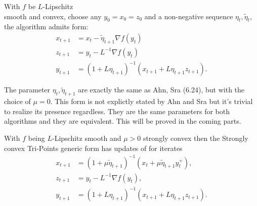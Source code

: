 \documentclass[12pt]{article}
\begin{document}
            \begin{definition}\label{def:agg_tri}
                With $f$ be $L$-Lipschitz \\ 
                smooth and convex, choose any $y_0 = x_0=z_0$ and a non-negative sequence $\eta_t, \tilde\eta_t$, the algorithm admits form: 
                \begin{align*}
                    x_{t + 1} &= x_t - \tilde \eta_{t + 1} \nabla f(y_t) 
                    \\
                    z_{t + 1} &= y_t - L^{-1} \nabla f(y_t) 
                    \\
                    y_{t + 1} &= 
                    (1 + L\eta_{t + 1})^{-1}
                    (
                    x_{t + 1} + L\eta_{t + 1}z_{t + 1}
                    ). 
                \end{align*}
            \end{definition}
            \begin{remark}
                The parameter $\eta_t, \tilde\eta_{t + 1}$ are exactly the same as Ahn, Sra (6.24), but with the choice of $\mu = 0$. 
                This form is not explictly stated by Ahn and Sra but it's trivial to realize its presence regardless. 
                They are the same parameters for both algorithms and they are equivalent. 
                This will be proved in the coming parts. 
            \end{remark}
            \begin{definition}
                \quad 
                With $f$ being $L$-Lipschitz smooth and $\mu > 0$ strongly convex then the Strongly convex Tri-Points generic form has updates of for iterates
                \begin{align*}
                    x_{t + 1} &= (1 + \mu\tilde \eta_{t + 1})^{-1}(x_t + \mu\tilde\eta_{t + 1}y_t^+), 
                    \\
                    z_{t + 1} &= y_t - L^{-1}\nabla f(y_t), 
                    \\
                    y_{t + 1} &= (1 + L\eta_{t + 1})^{-1}(x_{t + 1} + L\eta_{t + 1}z_{t +1}). 
                \end{align*}
            \end{definition}
\end{document}
